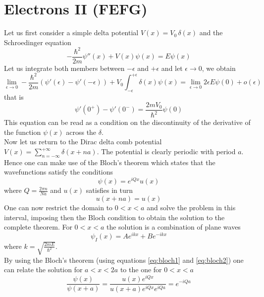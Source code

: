 \documentclass{article}
\begin{document}
\newpage

\section{Electrons II (FEFG)}

Let us first consider a simple delta potential $V(x) = V_0 \, \delta(x)$ and the Schroedinger equation 
\begin{equation*}
    -\frac{\hbar^2}{2m}\psi''(x) + V(x) \psi(x) = E \psi(x)
\end{equation*}
Let us integrate both members between $-\epsilon$ and $+\epsilon$ and let $\epsilon \to 0$, we obtain 
\begin{equation*}
    \lim_{\epsilon \to 0} -\frac{\hbar^2}{2m} \left(\psi'(\epsilon) - \psi'(-\epsilon)\right) + V_0\int_{-\epsilon}^{+\epsilon} \delta(x) \psi(x) = \lim_{\epsilon \to 0} 2\epsilon E \psi(0) + o(\epsilon)
\end{equation*} 
that is
\begin{equation*}
    \psi'(0^+) - \psi'(0^-) = \frac{2mV_0}{\hbar^2}\psi(0)
\end{equation*}
This equation can be read as a condition on the discontinuity of the derivative of the function $\psi(x)$ across the $\delta$. \\
Now let us return to the Dirac delta comb potential $V(x) = \sum_{n=-\infty}^{+\infty} \delta(x+na)$. The potential is clearly periodic with period $a$. Hence
one can make use of the Bloch's theorem which states that the wavefunctions satisfy the conditions
\begin{equation}
    \psi(x) = e^{iQx} u(x)
    \label{eq:bloch1}
\end{equation}
where $Q=\frac{2\pi n}{Na}$ and $u(x)$ satisfies in turn
\begin{equation}
    u(x+na) = u(x)
    \label{eq:bloch2}
\end{equation}
One can now restrict the domain to $0<x<a$ and solve the problem in this interval, imposing then the Bloch condition to obtain the solution 
to the complete theorem. For $0<x<a$ the solution is a combination of plane waves
\begin{equation*}
    \psi_I(x) = Ae^{ikx} + Be^{-ikx}
\end{equation*}
where $k = \sqrt{\frac{2mE}{\hbar^2}}$. \\
By using the Bloch's theorem (using equations \ref{eq:bloch1} and \ref{eq:bloch2}) one can relate the solution for $a<x<2a$ to the one for $0<x<a$
\begin{equation*}
    \frac{\psi(x)}{\psi(x+a)} = \frac{u(x)e^{iQx}}{u(x+a)e^{iQx}e^{iQa}} = e^{-iQa}
\end{equation*}
\end{document}
